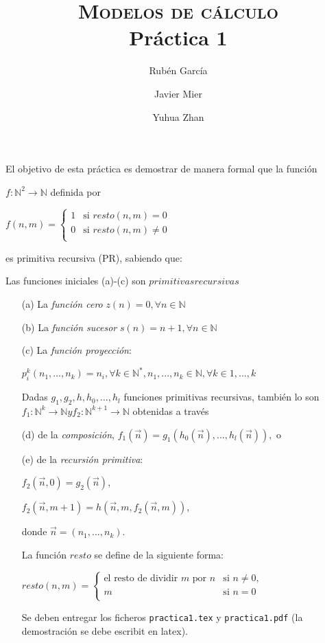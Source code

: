 \documentclass[a4paper,12pt]{article}
\title{\large{\textsc{Modelos de cálculo}} \\ \vspace{-2mm} \Large{Práctica 1}}
\author{Rubén García \and Javier Mier \and Yuhua Zhan}
\date{}
\begin{document}
\maketitle

\thispagestyle{fancy}

El objetivo de esta práctica es demostrar de manera formal que la función

$f: \mathbb{N} ^{2}\rightarrow \mathbb {N}$ definida por

$f(n,m)=\left\{
\begin{array}{cc}
    1&\text{si }resto(n,m) = 0\\
    0&\text{si }resto(n,m) \neq 0\\
\end{array}
\right.$

es primitiva recursiva (PR), sabiendo que:

Las funciones iniciales (a)-(c) son $primitivas recursivas$
\begin{itemize}
\item[(a)] La \textit{función cero} $z(n)=0, \forall n \in \mathbb {N} $
\item [(b)] La \textit{función sucesor} $s(n)=n+1, \forall n \in \mathbb {N} $
\item[(c)] La \textit{función proyección}:

$p^{k}_{i}(n_{1},...,n_{k})=n_{i},\forall k \in \mathbb {N}^{*},n_{1},...,n_{k} \in \mathbb{N}, \forall k \in {1,...,k}$

Dadas $g_1,g_2,h,h_0,...,h_l$
funciones primitivas recursivas, también lo son $f_1 :
\mathbb{N}^{k} \rightarrow \mathbb{N} y f_2: \mathbb{N}^{k+1} \rightarrow \mathbb{N}$ obtenidas a través

\item[(d)] de la \textit{composición}, $f_1(\vec{n}) = g_1(h_0(\vec{n}),...,h_l(\vec{n})),$ o

\item[(e)] de la \textit{recursión primitiva}: 

$f_2(\vec{n},0) = g_2(\vec{n})$,

$f_2(\vec{n},m+1) = h(\vec{n},m,f_2(\vec{n},m))$, 

donde $\vec{n} = (n_{1},...,n_{k})$.

La función $resto$ se define de la siguiente forma:

$resto(n,m)=
\begin{cases}
    \text{el resto de dividir $m$ por $n$}&\text{si }n \neq 0,\\
    m&\text{si }n = 0\\
\end{cases}
$

Se deben entregar los ficheros \texttt{practica1.tex} y \texttt{practica1.pdf} (la demostración se debe escribit en latex).

\end{itemize}
\end{document}

